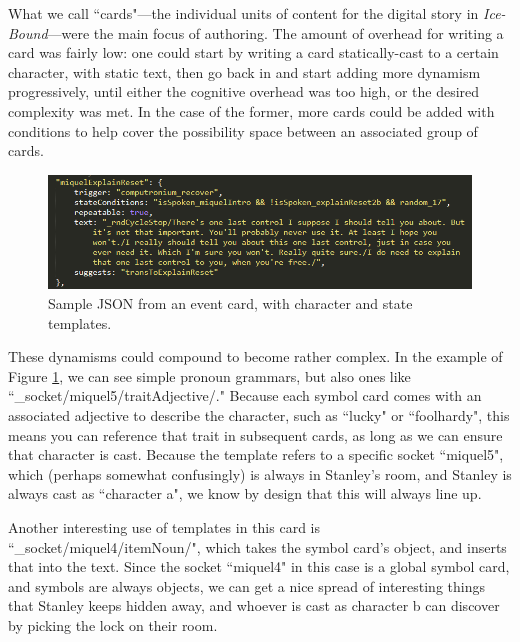 What we call ``cards"---the individual units of content for the digital story in \textit{Ice-Bound}---were the main focus of authoring. The amount of overhead for writing a card was fairly low: one could start by writing a card statically-cast to a certain character, with static text, then go back in and start adding more dynamism progressively, until either the cognitive overhead was too high, or the desired complexity was met. In the case of the former, more cards could be added with conditions to help cover the possibility space between an associated group of cards.


\begin{figure}
    \centering
    \includegraphics[width=\textwidth]{figures/2-Ice-Bound/dialogue-data.png}
    \caption{Sample JSON from an event card, with character and state templates.}
    \label{fig:dialogue-data}
\end{figure}


These dynamisms could compound to become rather complex. In the example of Figure \ref{fig:dialogue-data}, we can see simple pronoun grammars, but also ones like \newline
``\_socket/miquel5/traitAdjective/." Because each symbol card comes with an associated adjective to describe the character, such as ``lucky" or ``foolhardy", this means you can reference that trait in subsequent cards, as long as we can ensure that character is cast. Because the template refers to a specific socket ``miquel5", which (perhaps somewhat confusingly) is always in Stanley's room, and Stanley is always cast as ``character a", we know by design that this will always line up.

Another interesting use of templates in this card is ``\_socket/miquel4/itemNoun/", which takes the symbol card's object, and inserts that into the text. Since the socket ``miquel4" in this case is a global symbol card, and symbols are always objects, we can get a nice spread of interesting things that Stanley keeps hidden away, and whoever is cast as character b can discover by picking the lock on their room.

